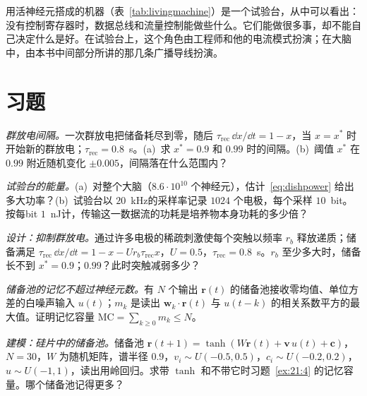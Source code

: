 用活神经元搭成的机器（表~\ref{tab:livingmachine}）是一个试验台，从中可以看出：没有控制寄存器时，数据总线和流量控制能做些什么。它们能做很多事，却不能自己决定什么是好。在试验台上，这个角色由工程师和他的电流模式扮演；在大脑中，由本书中间部分所讲的那几条广播导线扮演。

\section{习题}

\begin{exercise}[\lvlA]
\label{ex:21:1}
\emph{群放电间隔。}一次群放电把储备耗尽到零，随后 $\tau_{\text{rec}}\,\dd x/\dd t=1-x$，当 $x=x^*$ 时开始新的群放电；$\tau_{\text{rec}}=0.8$~s。(a)~求 $x^*=0.9$ 和 $0.99$ 时的间隔。(b)~阈值 $x^*$ 在 $0.99$ 附近随机变化 $\pm0.005$，间隔落在什么范围内？
\end{exercise}

\begin{exercise}[\lvlA]
\label{ex:21:2}
\emph{试验台的能量。}(a)~对整个大脑（$8.6\cdot10^{10}$ 个神经元），估计~\eqref{eq:dishpower} 给出多大功率？(b)~试验台以 $20$~kHz的采样率记录 $1024$ 个电极，每个采样 $10$~bit。按每bit $1$~nJ计，传输这一数据流的功耗是培养物本身功耗的多少倍？
\end{exercise}

\begin{exercise}[\lvlB]
\label{ex:21:3}
\emph{设计：抑制群放电。}通过许多电极的稀疏刺激使每个突触以频率 $r_b$ 释放递质；储备满足 $\tau_{\text{rec}}\,\dd x/\dd t=1-x-Ur_b\tau_{\text{rec}}x$，$U=0.5$，$\tau_{\text{rec}}=0.8$~s。$r_b$ 至少多大时，储备长不到 $x^*=0.9$；$0.99$？此时突触减弱多少？
\end{exercise}

\begin{exercise}[\lvlB]
\label{ex:21:4}
\emph{储备池的记忆不超过神经元数。}有 $N$ 个输出 $\mathbf r(t)$ 的储备池接收零均值、单位方差的白噪声输入 $u(t)$；$m_k$ 是读出 $\mathbf w_k\cdot\mathbf r(t)$ 与 $u(t-k)$ 的相关系数平方的最大值。证明记忆容量 $\mathrm{MC}=\sum_{k\ge0}m_k\le N$。
\end{exercise}

\begin{exercise}[\lvlB]
\label{ex:21:5}
\emph{建模：硅片中的储备池。}储备池 $\mathbf r(t+1)=\tanh(W\mathbf r(t)+\mathbf v\,u(t)+\mathbf c)$，$N=30$，$W$ 为随机矩阵，谱半径 $0.9$，$v_i\sim U(-0.5,0.5)$，$c_i\sim U(-0.2,0.2)$，$u\sim U(-1,1)$，读出用岭回归。求带 $\tanh$ 和不带它时习题~\ref{ex:21:4} 的记忆容量。哪个储备池记得更多？
\end{exercise}

